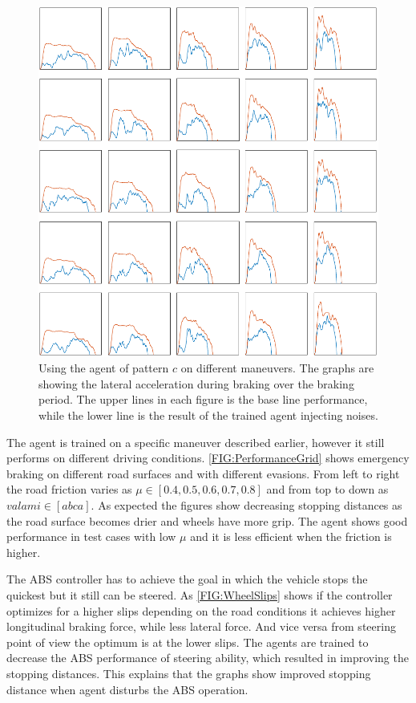 \documentclass[a4paper, fleqn]{template/cas-dc}
\begin{document}
	\begin{figure}[h]
		\centering
		\includegraphics[width=\columnwidth]{figures/AgentPerformanceGrid.pdf}
		\caption{Using the agent of pattern $c$ on different maneuvers. The graphs are showing the lateral acceleration during braking over the braking period. The upper lines in each figure is the base line performance, while the lower line is the result of the trained agent injecting noises.}
		\label{FIG:PerformanceGrid}
	\end{figure}	
	
	The agent is trained on a specific maneuver described earlier, however it still performs on different driving conditions. \autoref{FIG:PerformanceGrid} shows emergency braking on different road surfaces and with different evasions. From left to right the road friction varies as $\mu \in [0.4, 0.5, 0.6, 0.7, 0.8]$ and from top to down as $ valami \in [a b c a]$. As expected the figures show decreasing stopping distances as the road surface becomes drier and wheels have more grip. The agent shows good performance in test cases with low $\mu$ and it is less efficient when the friction is higher. 
	
	The ABS controller has to achieve the goal in which the vehicle stops the quickest but it still can be steered. As \autoref{FIG:WheelSlips} shows if the controller optimizes for a higher slips depending on the road conditions it achieves higher longitudinal braking force, while less lateral force. And vice versa from steering point of view the optimum is at the lower slips. The agents are trained to decrease the ABS performance of steering ability, which resulted in improving the stopping distances. This explains that the graphs show improved stopping distance when agent disturbs the ABS operation. 
			
\end{document}

